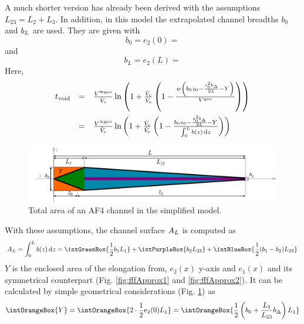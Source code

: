 A much shorter version has already been derived with the assumptions $L_{23} = L_2 
+ L_3$. %
In addition, in this model the extrapolated channel breadths $b_0$ and $b_L$ are used. They are given with
\begin{equation}
b_0 = e_2(0) = 
\end{equation}
and
\begin{equation}
b_L = e_2(L) = 
\end{equation}
Here, 
\begin{equation}
\begin{array}{lll}
\tvoid &= & \frac{\Vappgeo}{\Vc} \ln{
  \left(
  1 + \frac{\Vc}{\Ve}
  \left(
  1 - \frac{
    w 
    \left(
    b_0 z_0 
    - \frac{
      z_0^2 \bDelta
    }{
      2L} 
    - Y
    \right)
  }{\Vgeo}
  \right)
  \right)}
\\\addlinespace
&= &\frac{\Vappgeo}{\Vc} \ln{
  \left(
  1 + \frac{\Vc}{\Ve}
  \left(
  1 - \frac{
    b_0 z_0 
    - \frac{
      z_0^2 \bDelta
    }{
      2L
    } 
    -  Y
  }{
 \int_{0}^{L} b(z) \diff z 
}
  \right)
  \right)}
\end{array}
\end{equation}
\begin{figure}[H]
  \begin{center}
    \includegraphics[width=\linewidth]{./images/fffSimplified.pdf}
    \vspace*{-3ex}    
  \end{center}
  \caption[Total area of an AF4 channel in the simplified model]{
    Total area of an AF4 channel in the simplified model.}
  \label{fig:fffSimplied}
\end{figure}
With these assumptions, the channel surface $A_L$ is computed as
\begin{equation}
\AL = \int_{0}^{L} b(z) \diff z 
= 
\intGreenBox{\ensuremath{\frac{1}{2} b_1 L_1}}
+ 
\intPurpleBox{\ensuremath{b_2 L_{23}}}
+
\intBlueBox{\ensuremath{\frac{1}{2} (b_1-b_2) L_{23}}}
\end{equation}
$Y$ is the enclosed area of the elongation from,
$e_2(x)$ y-axis and $e_1(x)$ and its symmetrical counterpart 
(Fig. \ref{fig:fffApprox1} and \ref{fig:fffApprox2}). 
It can be calculated by simple geometrical considerations (Fig. \ref{fig:fffSimplied}) as 
\begin{equation}
\intOrangeBox{\ensuremath{Y}} = \intOrangeBox{\ensuremath{ 2 \cdot \frac{1}{2} e_2(0) L_1 }} = 
\intOrangeBox{\ensuremath{ \frac{1}{2}\left( b_0 + \frac{L_1}{L_{23}} \bDelta \right) L_1 }}
\end{equation}

